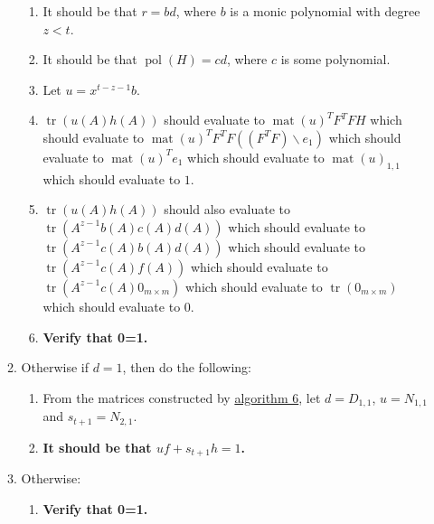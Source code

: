\documentclass[twocolumn]{article}
\DeclareMathOperator{\mat}{mat}
\DeclareMathOperator{\pol}{pol}
\DeclareMathOperator{\tr}{tr}
\begin{document}
\begin{enumerate}
\begin{enumerate}
\begin{enumerate}
						\item It should be that $r=bd$, where $b$ is a monic polynomial with degree $z<t$.
						\item It should be that $\pol(H)=cd$, where $c$ is some polynomial.
						\item Let $u=x^{t-z-1}b$.
						\item $\tr(u(A)h(A))$ should evaluate to $\mat(u)^TF^TFH$ which should evaluate to $\mat(u)^TF^TF((F^TF)\backslash e_1)$ which should evaluate to $\mat(u)^Te_1$ which should evaluate to $\mat(u)_{1,1}$ which should evaluate to $1$.
						\item $\tr(u(A)h(A))$ should also evaluate to $\tr(A^{z-1}b(A)c(A)d(A))$ which should evaluate to $\tr(A^{z-1}c(A)b(A)d(A))$ which should evaluate to $\tr(A^{z-1}c(A)f(A))$ which should evaluate to $\tr(A^{z-1}c(A)0_{m\times m})$ which should evaluate to $\tr(0_{m\times m})$ which should evaluate to $0$.
						\item \textbf{Verify that 0=1.}
					\end{enumerate}
					\item Otherwise if $d=1$, then do the following:
					\begin{enumerate}
						\item From the matrices constructed by \hyperref[sec:algorithm 6]{algorithm 6}, let $d=D_{1,1}$, $u=N_{1,1}$ and $s_{t+1}=N_{2,1}$.
						\item \textbf{It should be that $uf+s_{t+1}h=1$.}
					\end{enumerate}
					\item Otherwise:
					\begin{enumerate}
						\item \textbf{Verify that 0=1.}
					\end{enumerate}
				\end{enumerate}
			\end{enumerate}
\end{document}

